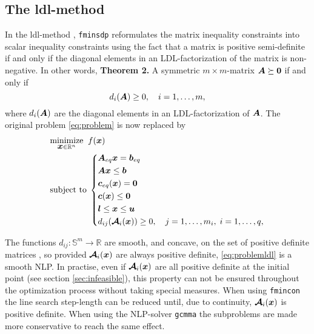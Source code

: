 \documentclass{article}
\newcommand{\bm}[1]{\mbox{\boldmath $#1$}}
\begin{document}

\subsection{The ldl-method}

In the ldl-method \cite{Vanderbei:2000,Bogani:2009}, \texttt{fminsdp} reformulates the matrix inequality constraints into scalar inequality constraints using the fact that a matrix is positive semi-definite if and only if the diagonal elements in an LDL-factorization of the matrix is non-negative. In other words, 
\vskip 2mm
\noindent \textbf{Theorem 2.} A symmetric $m\times m$-matrix $\bm{A} \succeq \bm{0}$ if and only if
\begin{equation}
d_{i}(\bm{A}) \geq 0, \quad i=1,\ldots,m,
\end{equation}
where $d_{i}(\bm{A})$ are the diagonal elements in an LDL-factorization of $\bm{A}$.
\vskip 2mm
The original problem \eqref{eq:problem} is now replaced by
\begin{equation}\label{eq:problemldl}
\quad
	\begin{aligned}
	&	\underset{\bm{x}\in\mathbb{R}^{n}}{\mbox{minimize}} \;\; f(\bm{x})  \\
	&	\mbox{subject to} \;
	\left\{
		\begin{aligned}
			& \bm{A}_{eq}\bm{x} = \bm{b}_{eq} &\\
			& \bm{A}\bm{x} \leq \bm{b}	      &\\
			& \bm{c}_{eq}(\bm{x}) = \bm{0}	 	&\\
		  & \bm{c}(\bm{x}) \leq \bm{0}			&\\
			& \bm{l} \leq \bm{x} \leq \bm{u}	&\\
			& d_{ij}(\bm{\mathcal{A}}_{i}(\bm{x})) \geq 0, \quad j=1,\ldots,m_{i},\; i=1,\ldots,q ,  &
		\end{aligned}
		\right.
	\end{aligned}
\end{equation}

The functions $d_{ij} : \mathbb{S}^{m} \rightarrow \mathbb{R}$ are smooth, and concave, on the set of positive
definite matrices \cite{Vanderbei:2000}, so provided $\bm{\mathcal{A}}_{i}(\bm{x})$ are always positive definite,
\eqref{eq:problemldl} is a smooth NLP. In practise, even if $\bm{\mathcal{A}}_{i}(\bm{x})$ are all positive definite at the initial point (see section \ref{sec:infeasible}), this property can not be ensured throughout the optimization process without taking
special measures. When using \texttt{fmincon} the line search step-length can be reduced until, due to continuity, $\bm{\mathcal{A}}_{i}(\bm{x})$ is positive definite. When using the NLP-solver \texttt{gcmma} the subproblems are made more conservative to reach the same effect. 
\end{document}
